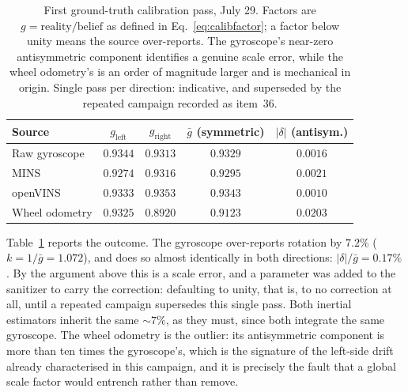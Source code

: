 \begin{table}[htbp]
\centering
\caption{First ground-truth calibration pass, July 29. Factors are
$g=\text{reality}/\text{belief}$ as defined in Eq.~\ref{eq:calibfactor}; a
factor below unity means the source over-reports. The gyroscope's near-zero
antisymmetric component identifies a genuine scale error, while the wheel
odometry's is an order of magnitude larger and is mechanical in origin.
Single pass per direction: indicative, and superseded by the repeated
campaign recorded as item~36.}
\label{tab:calib29}
\begin{tabular}{lcccc}
\hline
Source & $g_{\text{left}}$ & $g_{\text{right}}$ & $\bar g$ (symmetric)
       & $\lvert\delta\rvert$ (antisym.) \\
\hline
Raw gyroscope   & $0.9344$ & $0.9313$ & $0.9329$ & $0.0016$ \\
MINS            & $0.9274$ & $0.9316$ & $0.9295$ & $0.0021$ \\
openVINS        & $0.9333$ & $0.9353$ & $0.9343$ & $0.0010$ \\
Wheel odometry  & $0.9325$ & $0.8920$ & $0.9123$ & $0.0203$ \\
\hline
\end{tabular}
\end{table}

Table~\ref{tab:calib29} reports the outcome. The gyroscope over-reports
rotation by $7.2\%$ ($k=1/\bar g=1.072$), and does so almost identically in
both directions: $\lvert\delta\rvert/\bar g=0.17\%$. By the argument above
this is a scale error, and a
 parameter was added to the sanitizer to
carry the correction: defaulting to unity, that is, to no correction at
all, until a repeated campaign supersedes this single pass. Both inertial
estimators inherit the same $\sim7\%$, as they must, since both integrate
the same gyroscope. The wheel odometry is the outlier: its antisymmetric
component is more than ten times the gyroscope's, which is the signature of
the left-side drift already characterised in this campaign, and it is
precisely the fault that a global scale factor would entrench rather than
remove.

